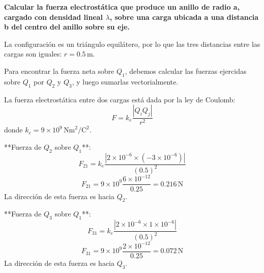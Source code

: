 \documentclass[answers]{exam} %
\begin{document}
\begin{questions}
\begin{minipage}{\textwidth}
	\end{minipage}

	\vspace{0.5cm}

	\question \large\textbf{Calcular la fuerza electrostática que produce un anillo de radio a, cargado con densidad lineal $\lambda$, sobre una carga ubicada a una distancia b del centro del anillo
		sobre su eje. }
	\begin{multicols}{2} %
		La configuración es un triángulo equilátero, por lo que las tres distancias entre las cargas son iguales: \( r = 0.5 \, \text{m} \).

		Para encontrar la fuerza neta sobre \( Q_1 \), debemos calcular las fuerzas ejercidas sobre \( Q_1 \) por \( Q_2 \) y \( Q_3 \), y luego sumarlas vectorialmente.

		La fuerza electrostática entre dos cargas está dada por la ley de Coulomb:
		\[
			F = k_e \frac{|Q_i Q_j|}{r^2}
		\]
		donde \( k_e = 9 \times 10^9 \, \text{Nm}^2/\text{C}^2 \).

		**Fuerza de \( Q_2 \) sobre \( Q_1 \)**:
		\[
			F_{21} = k_e \frac{|2 \times 10^{-6} \times (-3 \times 10^{-6})|}{(0.5)^2}
		\]
		\[
			F_{21} = 9 \times 10^9 \frac{6 \times 10^{-12}}{0.25} = 0.216 \, \text{N}
		\]
		La dirección de esta fuerza es hacia \( Q_2 \).

		**Fuerza de \( Q_3 \) sobre \( Q_1 \)**:
		\[
			F_{31} = k_e \frac{|2 \times 10^{-6} \times 1 \times 10^{-6}|}{(0.5)^2}
		\]
		\[
			F_{31} = 9 \times 10^9 \frac{2 \times 10^{-12}}{0.25} = 0.072 \, \text{N}
		\]
		La dirección de esta fuerza es hacia \( Q_3 \).


\end{multicols}
\end{questions}
\end{document}
